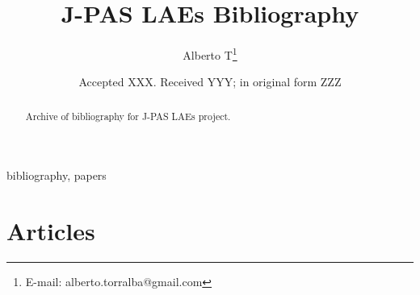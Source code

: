 \documentclass[a4paper,fleqn,usenatbib]{mnras}
\title[J-LAEs bib]{J-PAS LAEs Bibliography}
\author[Alberto T]{
Alberto T\thanks{E-mail: alberto.torralba@gmail.com}
}
\date{Accepted XXX. Received YYY; in original form ZZZ}
\begin{document}
\label{firstpage}
\pagerange{\pageref{firstpage}--\pageref{lastpage}}
\maketitle

\begin{abstract}


Archive of bibliography for J-PAS LAEs project.
\end{abstract}

\begin{keywords}
bibliography, papers
\end{keywords}





\section*{Articles}
\end{document}
